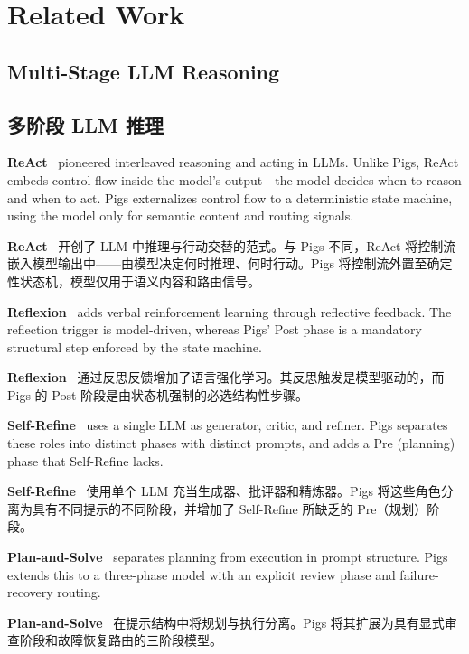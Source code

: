 \section{Related Work}
\label{sec:related}

\subsection{Multi-Stage LLM Reasoning}
\begin{chinese}
\subsection{多阶段 LLM 推理}
\end{chinese}

\textbf{ReAct}~\citep{yao2022react} pioneered interleaved reasoning and acting in LLMs. Unlike Pigs, ReAct embeds control flow inside the model's output---the model decides when to reason and when to act. Pigs externalizes control flow to a deterministic state machine, using the model only for semantic content and routing signals.
\begin{chinese}
\textbf{ReAct}~\citep{yao2022react} 开创了 LLM 中推理与行动交替的范式。与 Pigs 不同，ReAct 将控制流嵌入模型输出中——由模型决定何时推理、何时行动。Pigs 将控制流外置至确定性状态机，模型仅用于语义内容和路由信号。
\end{chinese}

\textbf{Reflexion}~\citep{shinn2023reflexion} adds verbal reinforcement learning through reflective feedback. The reflection trigger is model-driven, whereas Pigs' Post phase is a mandatory structural step enforced by the state machine.
\begin{chinese}
\textbf{Reflexion}~\citep{shinn2023reflexion} 通过反思反馈增加了语言强化学习。其反思触发是模型驱动的，而 Pigs 的 Post 阶段是由状态机强制的必选结构性步骤。
\end{chinese}

\textbf{Self-Refine}~\citep{madaan2023selfrefine} uses a single LLM as generator, critic, and refiner. Pigs separates these roles into distinct phases with distinct prompts, and adds a Pre (planning) phase that Self-Refine lacks.
\begin{chinese}
\textbf{Self-Refine}~\citep{madaan2023selfrefine} 使用单个 LLM 充当生成器、批评器和精炼器。Pigs 将这些角色分离为具有不同提示的不同阶段，并增加了 Self-Refine 所缺乏的 Pre（规划）阶段。
\end{chinese}

\textbf{Plan-and-Solve}~\citep{wang2023plan} separates planning from execution in prompt structure. Pigs extends this to a three-phase model with an explicit review phase and failure-recovery routing.
\begin{chinese}
\textbf{Plan-and-Solve}~\citep{wang2023plan} 在提示结构中将规划与执行分离。Pigs 将其扩展为具有显式审查阶段和故障恢复路由的三阶段模型。
\end{chinese}

